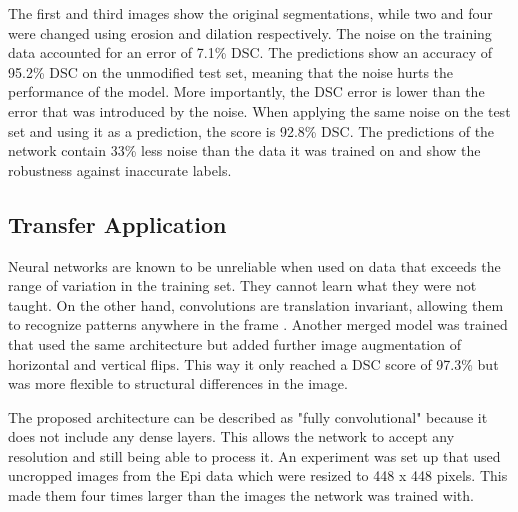 The first and third images show the original segmentations, while two and four were changed using erosion and dilation respectively. The noise on the training data accounted for an error of 7.1\% DSC. The predictions show an accuracy of 95.2\% DSC on the unmodified test set, meaning that the noise hurts the performance of the model. More importantly, the DSC error is lower than the error that was introduced by the noise. When applying the same noise on the test set and using it as a prediction, the score is 92.8\% DSC. The predictions of the network contain 33\% less noise than the data it was trained on and show the robustness against inaccurate labels.

\subsection{Transfer Application}

Neural networks are known to be unreliable when used on data that exceeds the range of variation in the training set. They cannot learn what they were not taught. On the other hand, convolutions are translation invariant, allowing them to recognize patterns anywhere in the frame \cite{Chollet2017}. Another merged model was trained that used the same architecture but added further image augmentation of horizontal and vertical flips. This way it only reached a DSC score of 97.3\% but was more flexible to structural differences in the image.

The proposed architecture can be described as "fully convolutional" because it does not include any dense layers. This allows the network to accept any resolution and still being able to process it. An experiment was set up that used uncropped images from the Epi data which were resized to 448 x 448 pixels. This made them four times larger than the images the network was trained with.

